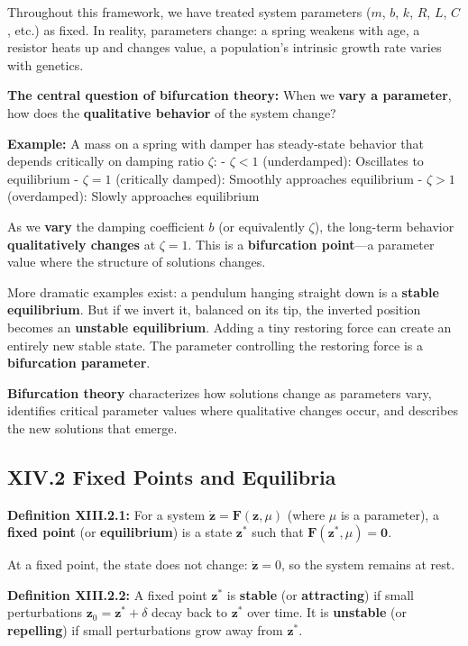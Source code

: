 \documentclass[
]{article}
\begin{document}
Throughout this framework, we have treated system parameters (\(m\),
\(b\), \(k\), \(R\), \(L\), \(C\), etc.) as fixed. In reality,
parameters change: a spring weakens with age, a resistor heats up and
changes value, a population's intrinsic growth rate varies with
genetics.

\textbf{The central question of bifurcation theory:} When we
\textbf{vary a parameter}, how does the \textbf{qualitative behavior} of
the system change?

\textbf{Example:} A mass on a spring with damper has steady-state
behavior that depends critically on damping ratio \(\zeta\): -
\(\zeta < 1\) (underdamped): Oscillates to equilibrium - \(\zeta = 1\)
(critically damped): Smoothly approaches equilibrium - \(\zeta > 1\)
(overdamped): Slowly approaches equilibrium

As we \textbf{vary} the damping coefficient \(b\) (or equivalently
\(\zeta\)), the long-term behavior \textbf{qualitatively changes} at
\(\zeta = 1\). This is a \textbf{bifurcation point}---a parameter value
where the structure of solutions changes.

More dramatic examples exist: a pendulum hanging straight down is a
\textbf{stable equilibrium}. But if we invert it, balanced on its tip,
the inverted position becomes an \textbf{unstable equilibrium}. Adding a
tiny restoring force can create an entirely new stable state. The
parameter controlling the restoring force is a \textbf{bifurcation
parameter}.

\textbf{Bifurcation theory} characterizes how solutions change as
parameters vary, identifies critical parameter values where qualitative
changes occur, and describes the new solutions that emerge.

\subsection{XIV.2 Fixed Points and
Equilibria}\label{xiv.2-fixed-points-and-equilibria}

\textbf{Definition XIII.2.1:} For a system
\(\dot{\mathbf{z}} = \mathbf{F}(\mathbf{z}, \mu)\) (where \(\mu\) is a
parameter), a \textbf{fixed point} (or \textbf{equilibrium}) is a state
\(\mathbf{z}^*\) such that
\(\mathbf{F}(\mathbf{z}^*, \mu) = \mathbf{0}\).

At a fixed point, the state does not change: \(\dot{\mathbf{z}} = 0\),
so the system remains at rest.

\textbf{Definition XIII.2.2:} A fixed point \(\mathbf{z}^*\) is
\textbf{stable} (or \textbf{attracting}) if small perturbations
\(\mathbf{z}_0 = \mathbf{z}^* + \delta\) decay back to \(\mathbf{z}^*\)
over time. It is \textbf{unstable} (or \textbf{repelling}) if small
perturbations grow away from \(\mathbf{z}^*\).
\end{document}
